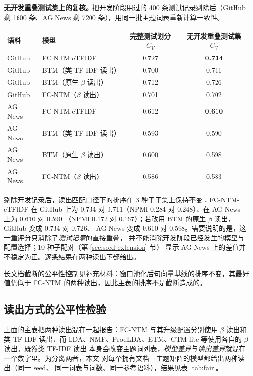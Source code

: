 \documentclass[11pt]{ctexart}
\newcommand{\fcntm}{FC-NTM}
\begin{document}
\textbf{无开发重叠测试集上的复核。}把开发阶段用过的 400 条测试记录剔除后（GitHub 剩 1600 条、AG News 剩 7200 条），用同一批主题词表重新计算一致性。
\begin{center}
\small
\setlength{\tabcolsep}{4pt}
\begin{tabular}{@{}llcc@{}}
\toprule
语料 & 模型 & 完整测试划分 $C_V$ & 无开发重叠测试集 $C_V$ \\
\midrule
GitHub & \fcntm{}-cTFIDF & 0.727 & \textbf{0.734} \\
GitHub & BTM（类 TF-IDF 读出） & 0.700 & 0.711 \\
GitHub & BTM（原生 $\beta$ 读出） & 0.712 & 0.726 \\
GitHub & \fcntm{}（$\beta$ 读出） & 0.701 & 0.702 \\
\midrule
AG News & \fcntm{}-cTFIDF & 0.612 & \textbf{0.610} \\
AG News & BTM（类 TF-IDF 读出） & 0.593 & 0.590 \\
AG News & BTM（原生 $\beta$ 读出） & 0.600 & 0.598 \\
AG News & \fcntm{}（$\beta$ 读出） & 0.586 & 0.583 \\
\bottomrule
\end{tabular}
\end{center}
剔除开发记录后，读出匹配口径下的排序在 3 种子子集上保持不变：\fcntm{}-cTFIDF 在 GitHub
上为 0.734 对 0.711（NPMI 0.284 对 0.248）、在 AG News 上为 0.610 对 0.590
（NPMI 0.172 对 0.167）；若改用 BTM 的原生 $\beta$ 读出，GitHub 变成 0.734 对 0.726、
AG News 变成 0.610 对 0.598。需要说明的是，这一重评分只消除了\emph{测试记录}的直接重叠，
并不能消除开发阶段已经发生的模型与配置选择；10 种子配对（第 \ref{sec:seed-extension} 节）
显示 AG News 上的差值并不稳定为正。逐条结果在两种读出下都给出。

长文档截断的公平性控制见补充材料：窗口池化后句向量基线的排序不变，其最好值仍低于
\fcntm{} 的两种读出，因此主表的排序不是截断造成的。

\subsection{读出方式的公平性检验}
\label{sec:fair-readout}

上面的主表把两种读出混在一起报告：\fcntm{} 与其升级配置分别使用 $\beta$ 读出和类 TF-IDF
读出，而 LDA、NMF、ProdLDA、ETM、CTM-lite 等使用各自的 $\beta$ 读出。既然类 TF-IDF 读出
本身会改变主题词列表，\emph{模型差异}与\emph{读出差异}就混在一个数字里。为分离两者，本文
对每个拥有文档—主题矩阵的模型都给出两种读出（同一 seed、
同一词表与词数、同一参考语料），结果见表 \ref{tab:fair}。
\end{document}
